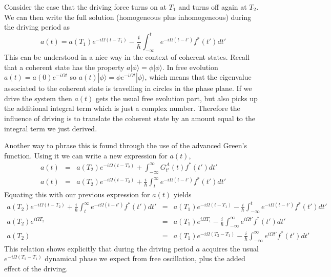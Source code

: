 Consider the case that the driving force turns on at $T_{1}$ and turns off again at $T_{2}$. We can then write the full solution (homogeneous plus inhomogeneous) during the driving period as \begin{equation}
a(t)=a(T_{1})e^{-i\Omega(t-T_{1})}-\frac{i}{\hbar}\int_{-\infty}^{t}e^{-i\Omega(t-t')}f^{*}(t')dt' \end{equation}
This can be understood in a nice way in the context of coherent states. Recall that a coherent state has the property $a|\phi\rangle=\phi|\phi\rangle$. In free evolution $a(t)=a(0)e^{-i\Omega t}$ so $a(t)|\phi\rangle=\phi e^{-i\Omega t}|\phi\rangle$, which means that the eigenvalue associated to the coherent state is travelling in circles in the phase plane. If we drive the system then $a(t)$ gets the usual free evolution part, but also picks up the additional integral term which is just a complex number. Therefore the influence of driving is to translate the coherent state by an amount equal to the integral term we just derived.

Another way to phrase this is found through the use of the advanced Green's function. Using it we can write a new expression for $a(t)$,\begin{eqnarray*}
a(t) & = & a(T_{2})e^{-i\Omega(t-T_{2})}+\int_{-\infty}^{\infty}G_{t'}^{A}(t)f^{*}(t')dt'\\
a(t) & = & a(T_{2})e^{-i\Omega(t-T_{2})}+\frac{i}{\hbar}\int_{t}^{\infty}e^{-i\Omega(t-t')}f^{*}(t')dt'\end{eqnarray*}
Equating this with our previous expression for $a(t)$ yields\begin{eqnarray*}
a(T_{2})e^{-i\Omega(t-T_{2})}+\frac{i}{\hbar}\int_{t}^{\infty}e^{-i\Omega(t-t')}f^{*}(t')dt' & = & a(T_{1})e^{-i\Omega(t-T_{1})}-\frac{i}{\hbar}\int_{-\infty}^{t}e^{-i\Omega(t-t')}f^{*}(t')dt'\\
a(T_{2})e^{i\Omega T_{2}} & = & a(T_{1})e^{i\Omega T_{1}}-\frac{i}{\hbar}\int_{-\infty}^{\infty}e^{i\Omega t'}f^{*}(t')dt'\\
a(T_{2}) & = & a(T_{1})e^{-i\Omega(T_{2}-T_{1})}-\frac{i}{\hbar}\int_{-\infty}^{\infty}e^{i\Omega t'}f^{*}(t')dt'\end{eqnarray*}
This relation shows explicitly that during the driving period $a$ acquires the usual $e^{-i\Omega(T_{2}-T_{1})}$ dynamical phase we expect from free oscillation, plus the added effect of the driving.

